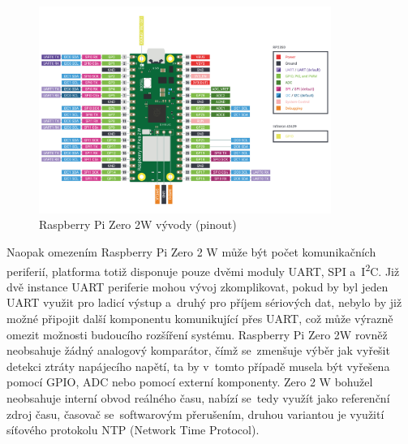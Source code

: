 \begin{figure}[h]
    \centering
    \includegraphics[width=0.85\textwidth]{obrazky-figures/pico2w-pinout.pdf}
    
    \caption{Raspberry Pi Zero 2W vývody (pinout)~\cite{raspberry_pi_pico_2w}}
    \label{fig:raspberry-pi-zero-2w}
\end{figure}

Naopak omezením Raspberry Pi Zero 2 W může být počet komunikačních periferií, platforma totiž disponuje pouze dvěmi moduly UART, SPI a~I\textsuperscript{2}C. Již dvě instance UART periferie mohou vývoj zkomplikovat, pokud by byl jeden UART využit pro ladicí výstup a~druhý pro příjem sériových dat, nebylo by již možné připojit další komponentu komunikující přes UART, což může výrazně omezit možnosti budoucího rozšíření systému. Raspberry Pi Zero 2W rovněž neobsahuje žádný analogový komparátor, čímž se~zmenšuje výběr jak vyřešit detekci ztráty napájecího napětí, ta by v~tomto případě musela být vyřešena pomocí GPIO, ADC nebo pomocí externí komponenty. Zero 2 W bohužel neobsahuje interní obvod reálného času, nabízí se~tedy využít jako referenční zdroj času, časovač se~softwarovým přerušením, druhou variantou je využití síťového protokolu NTP (Network Time Protocol).~\cite{raspberry_pi_pico_2w}



